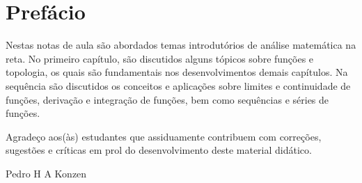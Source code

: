 
\chapter*{Prefácio}\label{prefacio}

Nestas notas de aula são abordados temas introdutórios de análise matemática na reta. No primeiro capítulo, são discutidos alguns tópicos sobre funções e topologia, os quais são fundamentais nos desenvolvimentos demais capítulos. Na sequência são discutidos os conceitos e aplicações sobre limites e continuidade de funções, derivação e integração de funções, bem como sequências e séries de funções.

Agradeço aos(às) estudantes que assiduamente contribuem com correções, sugestões e críticas em prol do desenvolvimento deste material didático.

\begin{flushright}
  Pedro H A Konzen
\end{flushright}